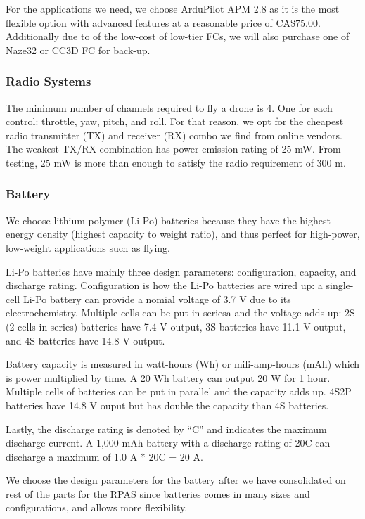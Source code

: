 For the applications we need, we choose ArduPilot APM 2.8 as it is the most flexible option with advanced features at a reasonable price of CA\$75.00. Additionally due to of the low-cost of low-tier FCs, we will also purchase one of Naze32 or CC3D FC for back-up.

\subsubsection{Radio Systems}

The minimum number of channels required to fly a drone is 4. One for each control: throttle, yaw, 
pitch, and roll. For that reason, we opt for the cheapest radio transmitter (TX) and receiver  (RX) 
combo we find from online vendors. The weakest TX/RX combination has power emission rating of 25 mW. 
From testing, 25 mW is more than enough to satisfy the radio requirement of 300 m.

\subsubsection{Battery}

We choose lithium polymer (Li-Po) batteries because they have the highest energy density (highest 
capacity to weight ratio), and thus perfect for high-power, low-weight applications such as flying. 

Li-Po batteries have mainly three design parameters: configuration, capacity, and discharge rating. 
Configuration is how the Li-Po batteries are wired up: a single-cell Li-Po battery can provide a 
nomial voltage of 3.7 V due to its electrochemistry. Multiple cells can be put in seriesa and the 
voltage adds up: 2S (2 cells in series) batteries have 7.4 V output, 3S batteries have 11.1 V output,
 and 4S batteries have 14.8 V output.

Battery capacity is measured in watt-hours (Wh) or mili-amp-hours (mAh) which is power multiplied by time. A 20 Wh battery can output 20 W for 1 hour. Multiple cells of batteries can be put in parallel and the capacity adds up. 4S2P batteries have 14.8 V ouput but has double the capacity than 4S batteries.

Lastly, the discharge rating is denoted by “C” and indicates the maximum discharge current. A 1,000 
mAh battery with a discharge rating of 20C can discharge a maximum of 1.0 A * 20C = 20 A.

We choose the design parameters for the battery after we have consolidated on rest of the parts for the RPAS since batteries comes in many sizes and configurations, and allows more flexibility.
